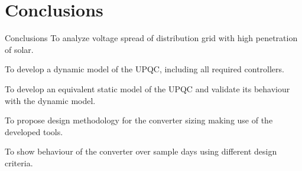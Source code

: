 \section{Conclusions}
\begin{frame}{}
    \tableofcontents[currentsection]
\end{frame}


\begin{frame}{Conclusions}
    \textcolor{green}{} To analyze voltage spread of distribution grid with high penetration of solar.

    \textcolor{green}{} To develop a dynamic model of the UPQC, including all required controllers.

    \textcolor{green}{} To develop an equivalent static model of the UPQC and validate its behaviour with the dynamic model.

    \textcolor{green}{} To propose design methodology for the converter sizing making use of the developed tools.

    \textcolor{green}{} To show behaviour of the converter over sample days using different design criteria.
\end{frame}



